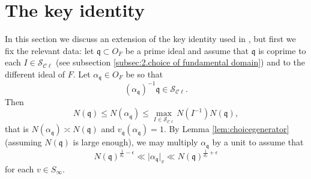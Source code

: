 \documentclass[a4paper,11pt]{amsart}
\theoremstyle{definition}
\newcommand{\cl}{\mathcal{C}\ell}
\begin{document}
\section{The key identity}\label{sec:keyidentity}In this section we discuss an extension of the key identity used in \cite{nelsonholowinsky}, but first we fix the relevant data: let $\mathfrak{q}\subset O_F$ be a 
prime ideal and  assume that $\mathfrak{q}$ is coprime to each $I\in \mathcal{S}_{\cl}$ (see subsection \ref{subsec:2.choice of fundamental domain}) and to the different ideal of $F$. Let $\alpha_{\mathfrak{q}} \in O_F$ be so that \begin{equation}\label{def:alpha}(\alpha_{\mathfrak{q}})^{-1}\mathfrak{q} \in \mathcal{S}_{\cl}.\end{equation} Then $$N(\mathfrak{q})\leq N(\alpha_{\mathfrak{q}}) \leq  \max_{I\in \mathcal{S}_{\cl}}N(I^{-1})N(\mathfrak{q}),$$ that is $N(\alpha_\mathfrak{q}) \asymp N(\mathfrak{q})$ and $v_{\mathfrak{q}}(\alpha_\mathfrak{q})=1$. By Lemma \ref{lem:choicegenerator} (assuming $N(\mathfrak{q})$ is large enough), we may multiply $\alpha_{\mathfrak{q}}$ by a unit to assume that $$N(\mathfrak{q})^{\frac{1}{d_v}-\epsilon }\ll \vert{\alpha_{\mathfrak{q}}}\vert_v \ll N(\mathfrak{q})^{\frac{1}{d_v}+\epsilon}$$ for each $v\in S_{\infty}$.
\end{document}
